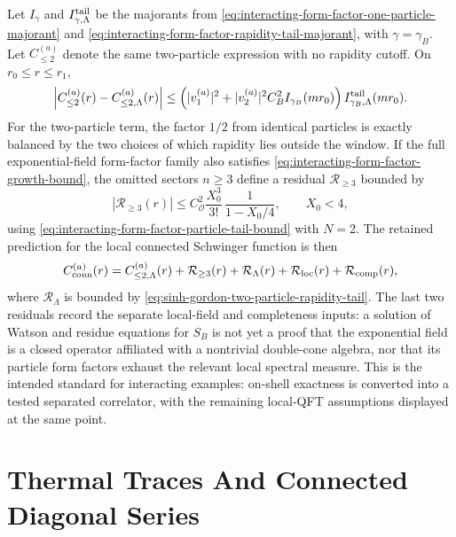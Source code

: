 \begin{controlledapproximation}
Let \(I_{\gamma}\) and \(I_{\gamma,\Lambda}^{\rm tail}\) be the majorants
from \eqref{eq:interacting-form-factor-one-particle-majorant} and
\eqref{eq:interacting-form-factor-rapidity-tail-majorant}, with
\(\gamma=\gamma_B\).  Let \(C_{\le2}^{(a)}\) denote the same two-particle
expression with no rapidity cutoff.  On \(r_0\le r\le r_1\),
\begin{equation}
  \left|
  C_{\le2}^{(a)}(r)-C_{\le2,\Lambda}^{(a)}(r)
  \right|
  \le
  \left(
    |v_1^{(a)}|^2
    +
    |v_2^{(a)}|^2 C_B^2 I_{\gamma_B}(mr_0)
  \right)
  I_{\gamma_B,\Lambda}^{\rm tail}(mr_0).
  \label{eq:sinh-gordon-two-particle-rapidity-tail}
\end{equation}
For the two-particle term, the factor \(1/2\) from identical particles is
exactly balanced by the two choices of which rapidity lies outside the
window.  If the full exponential-field form-factor family also satisfies
\eqref{eq:interacting-form-factor-growth-bound}, the omitted sectors
\(n\ge3\) define a residual \(\mathcal R_{\ge3}\) bounded by
\begin{equation}
  |\mathcal R_{\ge3}(r)|
  \le
  C_{\mathcal O}^2
  \frac{X_0^3}{3!}\,
  \frac{1}{1-X_0/4},
  \qquad X_0<4,
  \label{eq:sinh-gordon-higher-particle-tail}
\end{equation}
using \eqref{eq:interacting-form-factor-particle-tail-bound} with \(N=2\).
The retained prediction for the local connected Schwinger function is then
\[
  C_{\rm conn}^{(a)}(r)
  =
  C_{\le2,\Lambda}^{(a)}(r)
  +
  \mathcal R_{\ge3}(r)
  +
  \mathcal R_{\Lambda}(r)
  +
  \mathcal R_{\rm loc}(r)
  +
  \mathcal R_{\rm comp}(r),
\]
where \(\mathcal R_\Lambda\) is bounded by
\eqref{eq:sinh-gordon-two-particle-rapidity-tail}.  The last two residuals
record the separate local-field and completeness inputs: a solution of
Watson and residue equations for \(S_B\) is not yet a proof that the
exponential field is a closed operator affiliated with a nontrivial
double-cone algebra, nor that its particle form factors exhaust the relevant
local spectral measure.  This is the intended standard for interacting
examples: on-shell exactness is converted into a tested separated correlator,
with the remaining local-QFT assumptions displayed at the same point.
\end{controlledapproximation}

\section{Thermal Traces And Connected Diagonal Series}

